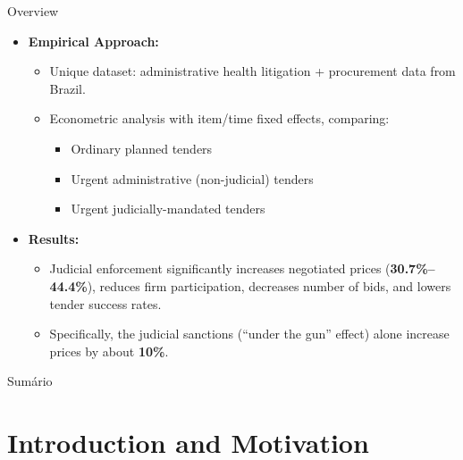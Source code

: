 \documentclass[aspectratio=169]{beamer}
\begin{document}
\begin{frame}{Overview}
\begin{itemize}
    \item \textbf{Empirical Approach:} 
    \begin{itemize}
        \item Unique dataset: administrative health litigation + procurement data from Brazil.
        \item Econometric analysis with item/time fixed effects, comparing:
        \begin{itemize}
            \item Ordinary planned tenders
            \item Urgent administrative (non-judicial) tenders
            \item Urgent judicially-mandated tenders
        \end{itemize}
    \end{itemize}
    \item \textbf{Results:}
    \begin{itemize}
        \item Judicial enforcement significantly increases negotiated prices (\textbf{30.7\%--44.4\%}), reduces firm participation, decreases number of bids, and lowers tender success rates.
        \item Specifically, the judicial sanctions (“under the gun” effect) alone increase prices by about \textbf{10\%}.
    \end{itemize}
    
\end{itemize}
\end{frame}

\begin{frame}{Sumário}
  \tableofcontents
\end{frame}

\section{Introduction and Motivation}
\end{document}
